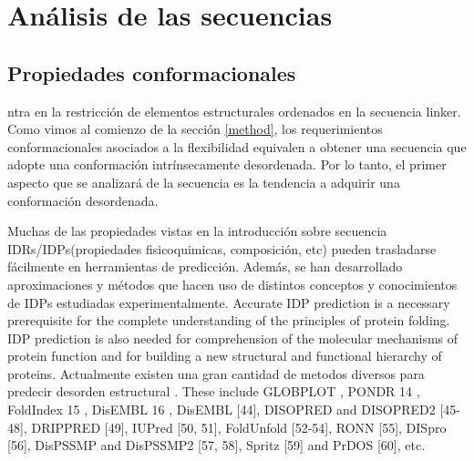 \chapter{Análisis de las secuencias}
\label{tools}




\section{Propiedades conformacionales} \label{propiedadesConformacionales}



ntra en la restricción de elementos estructurales ordenados en la secuencia linker.
Como vimos al comienzo de la sección \ref{method}, los requerimientos conformacionales asociados a la flexibilidad equivalen a obtener una secuencia 
que adopte una conformación intrínsecamente desordenada. Por lo tanto, el primer aspecto que se analizará de la secuencia es la tendencia a adquirir una conformación desordenada.

Muchas de las propiedades vistas en la introducción sobre secuencia IDRs/IDPs(propiedades fisicoquimicas, composición, etc) pueden trasladarse fácilmente en herramientas de predicción.
Además, se han desarrollado aproximaciones y métodos que hacen uso de distintos conceptos y conocimientos de IDPs estudiadas experimentalmente.
Accurate IDP prediction is a necessary prerequisite for the complete understanding of the principles of protein folding. IDP prediction is also needed for comprehension of the molecular mechanisms of protein function and
for building a new structural and functional hierarchy of proteins.
Actualmente existen una gran cantidad de metodos diversos para predecir desorden estructural \cite{he2009predicting}.
These include GLOBPLOT \cite{linding2003globplot}, PONDR 14 , FoldIndex 15 , DisEMBL 16 ,  DisEMBL [44], DISOPRED and DISOPRED2 [45-48],
DRIPPRED [49], IUPred [50, 51], FoldUnfold [52-54], RONN [55], DISpro [56], DisPSSMP and DisPSSMP2 [57, 58], Spritz [59] and PrDOS [60], etc.

